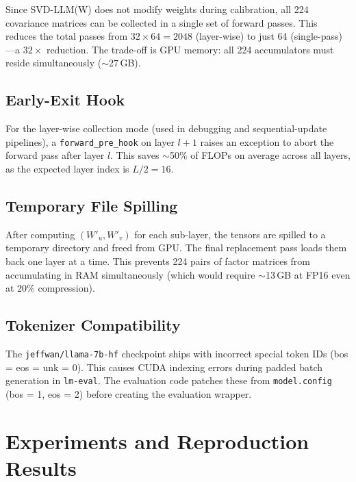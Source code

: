 \documentclass[11pt,a4paper]{article}
\theoremstyle{remark}
\begin{document}
Since SVD-LLM(W) does not modify weights during calibration, all 224
covariance matrices can be collected in a single set of forward passes.  This
reduces the total passes from $32 \times 64 = 2048$ (layer-wise) to just 64
(single-pass)---a $32\times$ reduction.  The trade-off is GPU memory: all 224
accumulators must reside simultaneously ($\sim$27\,GB).

\subsection{Early-Exit Hook}

For the layer-wise collection mode (used in debugging and sequential-update
pipelines), a \texttt{forward\_pre\_hook} on layer $l{+}1$ raises an exception
to abort the forward pass after layer $l$.  This saves $\sim$50\% of FLOPs on
average across all layers, as the expected layer index is $L/2 = 16$.

\subsection{Temporary File Spilling}

After computing $(W'_u, W'_v)$ for each sub-layer, the tensors are spilled to
a temporary directory and freed from GPU.  The final replacement pass loads
them back one layer at a time.  This prevents 224 pairs of factor matrices
from accumulating in RAM simultaneously (which would require $\sim$13\,GB at
FP16 even at 20\% compression).

\subsection{Tokenizer Compatibility}

The \texttt{jeffwan/llama-7b-hf} checkpoint ships with incorrect special token
IDs (bos = eos = unk = 0).  This causes CUDA indexing errors during padded
batch generation in \texttt{lm-eval}.  The evaluation code patches these from
\texttt{model.config} (bos = 1, eos = 2) before creating the evaluation wrapper.

\section{Experiments and Reproduction Results}
\label{sec:exp}
\end{document}
